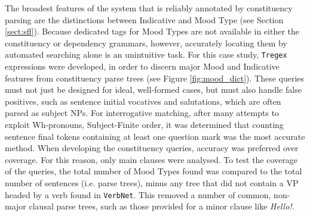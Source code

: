 The broadest features of the  system that is reliably annotated by constituency parsing are the distinctions between Indicative and Mood Type (see Section \ref{sect:sfl}). Because dedicated tags for Mood Types are not available in either the constituency or dependency grammars, however, accurately locating them by automated searching alone is an unintuitive task. For this case study, \texttt{Tregex} expressions were developed, in order to discern major Mood and Indicative features from constituency parse trees (see Figure \ref{fig:mood_dict}). These queries must not just be designed for ideal, well\hyp{}formed cases, but must also handle false positives, such as sentence initial vocatives and salutations, which are often parsed as subject NPs. For interrogative matching, after many attempts to exploit Wh\hyp{}pronouns, Subject\hyp{}Finite order, it was determined that counting sentence final tokens containing at least one question mark was the most accurate method. When developing the constituency queries, accuracy was preferred over coverage. For this reason, only main clauses were analysed. To test the coverage of the queries, the total number of Mood Types found was compared to the total number of sentences (i.e. parse trees), minus any tree that did not contain a VP headed by a verb found in \texttt{VerbNet}. This removed a number of common, non\hyp{}major clausal parse trees, such as those provided for a minor clause like \emph{Hello!}.

